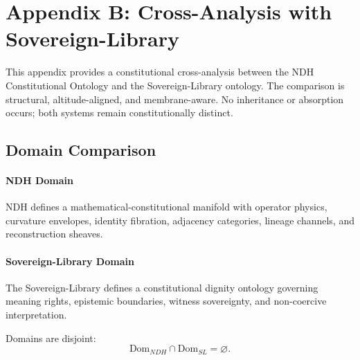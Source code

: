 
\appendix

\section{Appendix B: Cross-Analysis with Sovereign-Library}
\label{sec:appendix-cross-analysis}

This appendix provides a constitutional cross-analysis between the NDH
Constitutional Ontology and the Sovereign-Library ontology. The comparison
is structural, altitude-aligned, and membrane-aware. No inheritance or
absorption occurs; both systems remain constitutionally distinct.


\subsection{Domain Comparison}

\paragraph{NDH Domain}
NDH defines a mathematical-constitutional manifold with operator physics,
curvature envelopes, identity fibration, adjacency categories, lineage
channels, and reconstruction sheaves.

\paragraph{Sovereign-Library Domain}
The Sovereign-Library defines a constitutional dignity ontology governing
meaning rights, epistemic boundaries, witness sovereignty, and non-coercive
interpretation.

Domains are disjoint:
\[
\mathrm{Dom}_{NDH} \cap \mathrm{Dom}_{SL} = \varnothing.
\]


